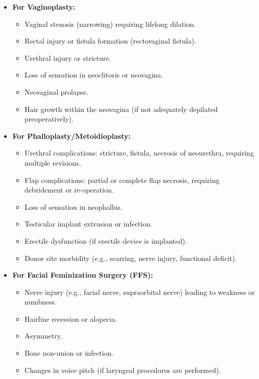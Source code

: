 \begin{itemize}
\begin{itemize}
\begin{itemize}
        \end{itemize}
      \item \textbf{For Vaginoplasty:}
        \begin{itemize}
          \item Vaginal stenosis (narrowing) requiring lifelong dilation.
          \item Rectal injury or fistula formation (rectovaginal fistula).
          \item Urethral injury or stricture.
          \item Loss of sensation in neoclitoris or neovagina.
          \item Neovaginal prolapse.
          \item Hair growth within the neovagina (if not adequately depilated preoperatively).
        \end{itemize}
      \item \textbf{For Phalloplasty/Metoidioplasty:}
        \begin{itemize}
          \item Urethral complications: stricture, fistula, necrosis of neourethra, requiring multiple revisions.
          \item Flap complications: partial or complete flap necrosis, requiring debridement or re-operation.
          \item Loss of sensation in neophallus.
          \item Testicular implant extrusion or infection.
          \item Erectile dysfunction (if erectile device is implanted).
          \item Donor site morbidity (e.g., scarring, nerve injury, functional deficit).
        \end{itemize}
      \item \textbf{For Facial Feminization Surgery (FFS):}
        \begin{itemize}
          \item Nerve injury (e.g., facial nerve, supraorbital nerve) leading to weakness or numbness.
          \item Hairline recession or alopecia.
          \item Asymmetry.
          \item Bone non-union or infection.
          \item Changes in voice pitch (if laryngeal procedures are performed).
        \end{itemize}
    \end{itemize}
\end{itemize}

